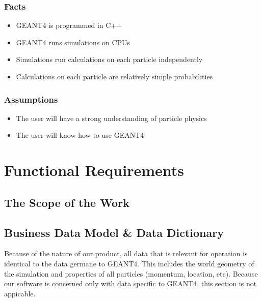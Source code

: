 \documentclass[12pt]{article}
\begin{document}
\subsubsection{Facts}
\begin{itemize}
\item GEANT4 is programmed in C++
\item GEANT4 runs simulations on CPUs
\item Simulations run calculations on each particle independently
\item Calculations on each particle are relatively simple probabilities
\end{itemize}

\subsubsection{Assumptions}
\begin{itemize}
\item The user will have a strong understanding of particle physics
\item The user will know how to use GEANT4
\end{itemize}

\section{Functional Requirements}

\subsection{The Scope of the Work} %

\subsection{Business Data Model \& Data Dictionary} %
Because of the nature of our product, all data that is relevant for operation is identical to the data germane to GEANT4. 
This includes the world geometry of the simulation and properties of all particles (momentum, location, etc). Because our 
software is concerned only with data specific to GEANT4, this section is not appicable. 

\end{document}
